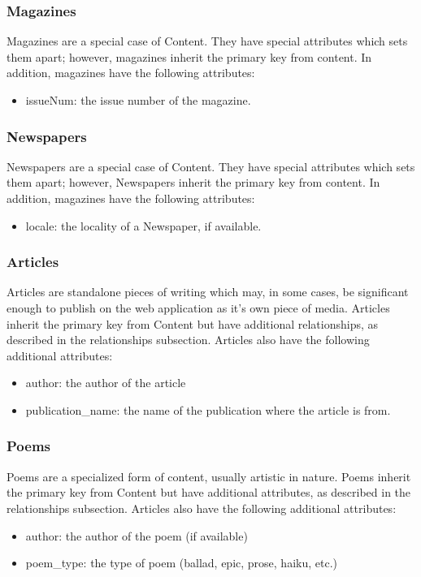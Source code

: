\documentclass[letter, 12pt, titlepage]{article}
\begin{document}
		\subsubsection{Magazines}
			Magazines are a special case of Content. They have special attributes which sets them apart; however, magazines inherit the primary key from content. In addition, magazines have the following attributes:
			\begin{itemize}
				\item issueNum: the issue number of the magazine.
			\end{itemize}		
		\subsubsection{Newspapers} 
				Newspapers are a special case of Content. They have special attributes which sets them apart; however, Newspapers inherit the primary key from content. In addition, magazines have the following attributes:
			\begin{itemize}
				\item locale: the locality of a Newspaper, if available.
			\end{itemize}	
		\subsubsection{Articles}		
			Articles are standalone pieces of writing which may, in some cases, be significant enough to publish on the web application as it's own piece of media. Articles inherit the primary key from Content but have additional relationships, as described in the relationships subsection. Articles also have the following additional attributes:
			\begin{itemize}
				\item author: the author of the article
				\item publication\_name: the name of the publication where the article is from.
			\end{itemize}
		\subsubsection{Poems}		
			Poems are a specialized form of content, usually artistic in nature. Poems inherit the primary key from Content but have additional attributes, as described in the relationships subsection. Articles also have the following additional attributes:
			\begin{itemize}
				\item author: the author of the poem (if available)
				\item poem\_type: the type of poem (ballad, epic, prose, haiku, etc.)
			\end{itemize}
\end{document}
